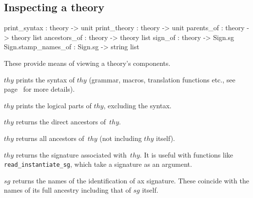\subsection{Inspecting a theory}\label{sec:inspct-thy}
\begin{ttbox}
print_syntax        : theory -> unit
print_theory        : theory -> unit
parents_of          : theory -> theory list
ancestors_of        : theory -> theory list
sign_of             : theory -> Sign.sg
Sign.stamp_names_of : Sign.sg -> string list
\end{ttbox}
These provide means of viewing a theory's components.
\begin{ttdescription}
\item[\ttindexbold{print_syntax} $thy$] prints the syntax of $thy$
  (grammar, macros, translation functions etc., see
  page~\pageref{pg:print_syn} for more details).
  
\item[\ttindexbold{print_theory} $thy$] prints the logical parts of
  $thy$, excluding the syntax.
  
\item[\ttindexbold{parents_of} $thy$] returns the direct ancestors
  of~$thy$.
  
\item[\ttindexbold{ancestors_of} $thy$] returns all ancestors of~$thy$
  (not including $thy$ itself).
  
\item[\ttindexbold{sign_of} $thy$] returns the signature associated
  with~$thy$.  It is useful with functions like {\tt
    read_instantiate_sg}, which take a signature as an argument.
  
\item[\ttindexbold{Sign.stamp_names_of} $sg$]
  returns the names of the identification  of ax
  signature.  These coincide with the names of its full ancestry
  including that of $sg$ itself.

\end{ttdescription}


